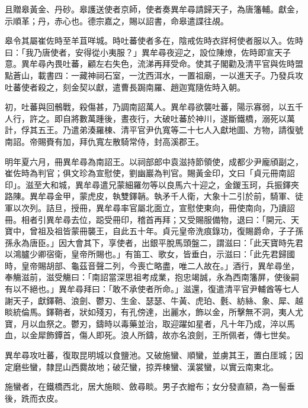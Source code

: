 \begin{pinyinscope}
 且贈皋黃金、丹砂。皋護送使者京師，使者奏異牟尋請歸天子，為唐籓輔。獻金，示順革；丹，赤心也。德宗嘉之，賜以詔書，命皋遣諜往覘。



 皋令其屬崔佐時至羊苴咩城。時吐蕃使者多在，陰戒佐時衣牂柯使者服以入。佐時曰：「我乃唐使者，安得從小夷服？」異牟尋夜迎之，設位陳燎，佐時即宣天子意。異牟尋內畏吐蕃，顧左右失色，流涕再拜受命。使其子閣勸及清平官與佐時盟點蒼山，載書四：一藏神祠石室，一沈西洱水，一置祖廟，一以進天子。乃發兵攻吐蕃使者殺之，刻金契以獻，遣曹長跼南羅、趙迦寬隨佐時入朝。



 初，吐蕃與回鶻戰，殺傷甚，乃調南詔萬人。異牟尋欲襲吐蕃，陽示寡弱，以五千人行，許之。即自將數萬踵後，晝夜行，大破吐蕃於神川，遂斷鐵橋，溺死以萬計，俘其五王。乃遣弟湊羅棟、清平官尹仇寬等二十七人入獻地圖、方物，請復號南詔。帝賜賚有加，拜仇寬左散騎常侍，封高溪郡王。



 明年夏六月，冊異牟尋為南詔王。以祠部郎中袁滋持節領使，成都少尹龐頎副之，崔佐時為判官；俱文珍為宣慰使，劉幽巖為判官。賜黃金印，文曰「貞元冊南詔印」。滋至大和城，異牟尋遣兄蒙細羅勿等以良馬六十迎之，金鍐玉珂，兵振鐸夾路陳。異牟尋金甲，蒙虎皮，執雙鐸韒。執矛千人衛，大象十二引於前，騎軍、徒軍以次列。詰旦，授冊，異牟尋率官屬北面立，宣慰使東向，冊使南向，乃讀詔冊。相者引異牟尋去位，跽受冊印，稽首再拜；又受賜服備物，退曰：「開元、天寶中，曾祖及祖皆蒙冊襲王，自此五十年。貞元皇帝洗痕錄功，復賜爵命，子子孫孫永為唐臣。」因大會其下，享使者，出銀平脫馬頭盤二，謂滋曰：「此天寶時先君以鴻臚少卿宿衛，皇帝所賜也。」有笛工、歌女，皆垂白，示滋曰：「此先君歸國時，皇帝賜胡部、龜茲音聲二列，今喪亡略盡，唯二人故在。」酒行，異牟尋坐，奉觴滋前，滋受觴曰：「南詔當深思祖考成業，抱忠竭誠，永為西南籓屏，使後嗣有以不絕也。」異牟尋拜曰：「敢不承使者所命。」滋還，復遣清平官尹輔酋等七人謝天子，獻鐸鞘、浪劍、鬱刃、生金、瑟瑟、牛黃、虎珀、氎、紡絲、象、犀、越睒統倫馬。鐸鞘者，狀如殘刃，有孔傍達，出麗水，飾以金，所擊無不洞，夷人尤寶，月以血祭之。鬱刃，鑄時以毒藥並治，取迎躍如星者，凡十年乃成，淬以馬血，以金犀飾鐔首，傷人即死。浪人所鑄，故亦名浪劍，王所佩者，傳七世矣。



 異牟尋攻吐蕃，復取昆明城以食鹽池。又破施蠻、順蠻，並虜其王，置白厓城；因定磨些蠻，隸昆山西爨故地；破茫蠻，掠弄棟蠻、漢裳蠻，以實云南東北。



 施蠻者，在鐵橋西北，居大施睒、斂尋睒。男子衣繒布；女分發直額，為一髻垂後，跣而衣皮。




\end{pinyinscope}
